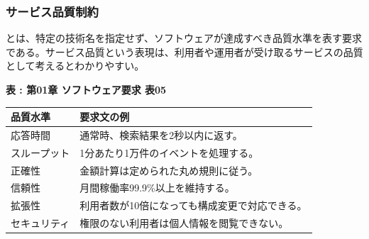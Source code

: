 \subsubsection{サービス品質制約}

とは、特定の技術名を指定せず、ソフトウェアが達成すべき品質水準を表す要求である。サービス品質という表現は、利用者や運用者が受け取るサービスの品質として考えるとわかりやすい。

\par\smallskip\noindent{}\label{tab:ch01-05}\textbf{表 \thetable: 第01章 ソフトウェア要求 表05}\par\smallskip
\begin{tabularx}{0.97\linewidth}{@{}p{.26\linewidth}X@{}}
\toprule
品質水準 & 要求文の例 \\
\midrule
応答時間 & 通常時、検索結果を2秒以内に返す。 \\
スループット & 1分あたり1万件のイベントを処理する。 \\
正確性 & 金額計算は定められた丸め規則に従う。 \\
信頼性 & 月間稼働率99.9\%以上を維持する。 \\
拡張性 & 利用者数が10倍になっても構成変更で対応できる。 \\
セキュリティ & 権限のない利用者は個人情報を閲覧できない。 \\
\bottomrule
\end{tabularx}

